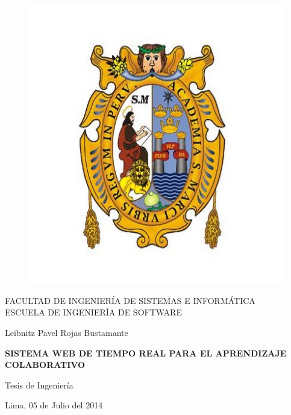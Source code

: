 \begin{titlepage}
\begin{center}
    \vspace*{-1in}
    \begin{figure}[htb]
        \begin{center}
            \includegraphics[scale=0.5]{./figuras/escudo_unmsm.jpg}
        \end{center}
    \end{figure}
    FACULTAD DE INGENIERÍA DE SISTEMAS E INFORMÁTICA\\
    \vspace*{0.5cm}
    ESCUELA DE INGENIERÍA DE SOFTWARE \\
    \vspace*{1cm}
    \begin{large}
    \end{large}
    \vspace*{1cm}
    \begin{center}
        Leibnitz Pavel Rojas Bustamante
    \end{center}
    \vspace*{2cm}
    \begin{Large}
    \textbf{SISTEMA WEB DE TIEMPO REAL PARA EL APRENDIZAJE COLABORATIVO} \\
    \end{Large}
    \vspace*{2cm}
    \begin{large}
        Tesis de Ingeniería\\
    \end{large}
    \vspace*{3cm}
    \begin{flushright}
    Lima, 05 de Julio del 2014
    \end{flushright}
\end{center}
\end{titlepage}
